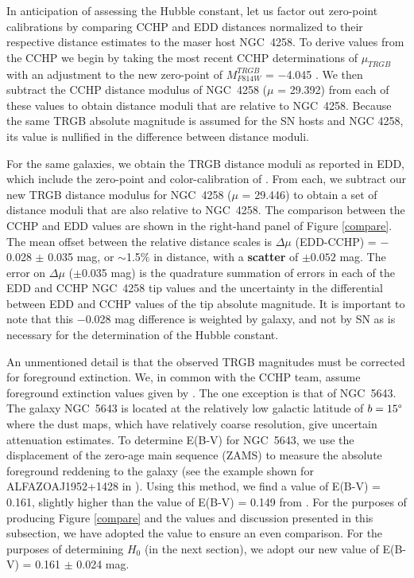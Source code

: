 \documentclass[twocolumn]{aastex62}
\begin{document}
In anticipation of assessing the Hubble constant, let us factor out zero-point calibrations by comparing CCHP and EDD distances normalized to their respective distance estimates to the maser host NGC~4258. To derive values from the CCHP we begin by taking the most recent CCHP determinations of $\mu_{TRGB}$ \citep{2019ApJ...882...34F,2021arXiv210112232H} with an adjustment to the new zero-point of $M^{TRGB}_{F814W}$ = $-$4.045 \citep{2021arXiv210613337H}. We then subtract the CCHP distance modulus of NGC~4258 ($\mu$ = 29.392) from each of these values to obtain distance moduli that are relative to NGC~4258. Because the same TRGB absolute magnitude is assumed for the SN hosts and NGC 4258, its value is nullified in the difference between distance moduli.   

For the same galaxies, we obtain the TRGB distance moduli as reported in EDD, which include the zero-point and color-calibration of \cite{2007ApJ...661..815R}. From each, we subtract our new TRGB distance modulus for NGC~4258 ($\mu$ = 29.446) to obtain a set of distance moduli that are also relative to NGC~4258. The comparison between the CCHP and EDD values are shown in the right-hand panel of Figure \ref{compare}. The mean offset between the relative distance scales is $\Delta \mu$ (EDD-CCHP) = $-$0.028 $\pm$ 0.035 mag, or $\sim$1.5$\%$ in distance, with a \textbf{scatter} of $\pm0.052$ mag. The error on $\Delta \mu$ ($\pm$0.035 mag) is the quadrature summation of errors in each of the EDD and CCHP NGC~4258 tip values and the uncertainty in the differential between EDD and CCHP values of the tip absolute magnitude. It is important to note that this $-$0.028 mag difference is weighted by galaxy, and not by SN as is necessary for the determination of the Hubble constant.

An unmentioned detail is that the observed TRGB magnitudes must be corrected for foreground extinction. We, in common with the CCHP team, assume foreground extinction values given by \cite{2011ApJ...737..103S}. The one exception is that of NGC~5643. The galaxy NGC~5643 is located at the relatively low galactic latitude of $b = 15\degree$ where the dust maps, which have relatively coarse resolution, give uncertain attenuation estimates. To determine E(B-V) for NGC~5643, we use the displacement of the zero-age main sequence (ZAMS) to measure the absolute foreground reddening to the galaxy (see the example shown for ALFAZOAJ1952+1428 in \citealt{2017ApJ...835...78R}). Using this method, we find a value of E(B-V) = 0.161, slightly higher than the value of E(B-V) = 0.149 from \cite{2011ApJ...737..103S}. For the purposes of producing Figure \ref{compare} and the values and discussion presented in this subsection, we have adopted the \cite{2011ApJ...737..103S} value to ensure an even comparison. For the purposes of determining $H_{0}$ (in the next section), we adopt our new value of E(B-V) = 0.161 $\pm$ 0.024 mag.
\end{document}
